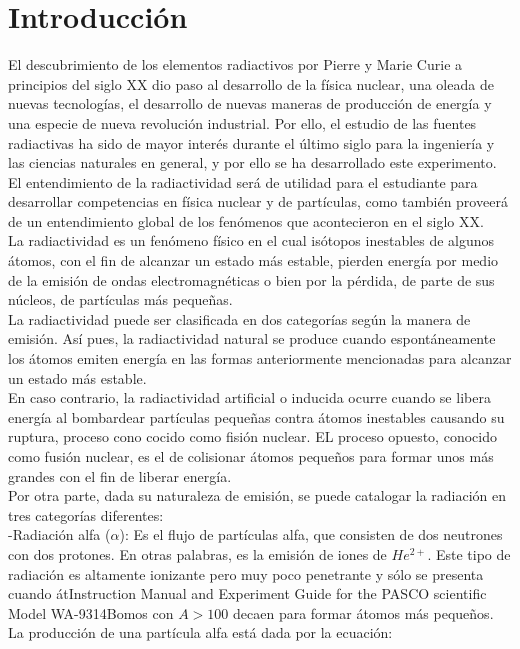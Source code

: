 \documentclass[%
 reprint,
 amsmath,amssymb,
 aps,
]{revtex4-1}
\begin{document}
\section{\label{sec:level1}Introducci\'on}

El descubrimiento de los elementos radiactivos por Pierre y Marie Curie a principios del siglo XX dio paso al desarrollo de la física nuclear, una oleada de nuevas tecnologías, el desarrollo de nuevas maneras de producción de energía y una especie de nueva revolución industrial. Por ello, el estudio de las fuentes radiactivas ha sido de mayor interés durante el último siglo para la ingeniería y las ciencias naturales en general, y por ello se ha desarrollado este experimento. El entendimiento de la radiactividad será de utilidad para el estudiante para desarrollar competencias en física nuclear y de partículas, como también proveerá de un entendimiento global de los fenómenos que acontecieron en el siglo XX.\\

La radiactividad es un fenómeno físico en el cual isótopos inestables de algunos átomos,  con el fin de alcanzar un estado más estable, pierden energía por medio de la emisión de ondas electromagnéticas o bien por la pérdida, de parte de sus núcleos, de partículas más pequeñas.\\

La radiactividad puede ser clasificada en dos categorías según la manera de emisión. Así pues, la radiactividad natural se produce cuando espontáneamente los átomos emiten energía en las formas anteriormente mencionadas para alcanzar un estado más estable.\\

En caso contrario, la radiactividad artificial o inducida ocurre cuando se libera energía al bombardear partículas pequeñas contra átomos inestables causando su ruptura, proceso cono cocido como fisión nuclear. EL proceso opuesto, conocido como fusión nuclear, es el de colisionar átomos pequeños para formar unos más grandes con el fin de liberar energía.\\

Por otra parte, dada su naturaleza de emisión, se puede catalogar la radiación en tres categorías diferentes:\\


-Radiación alfa ($ \alpha $): Es el flujo de partículas alfa, que consisten de dos neutrones con dos protones. En otras palabras, es la emisión de iones de $He^{2+}$. Este tipo de radiación es altamente ionizante pero muy poco penetrante y sólo se presenta cuando átInstruction Manual and Experiment Guide for the PASCO scientific Model WA-9314Bomos con $A>100$ decaen para formar átomos más pequeños. La producción de una partícula alfa está dada por la ecuación:\\
\end{document}
